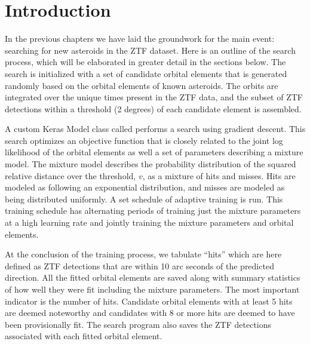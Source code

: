 \section{Introduction}
\label{section_search_intro}
In the previous chapters we have laid the groundwork for the main event: searching for new asteroids in the ZTF dataset.
Here is an outline of the search process, which will be elaborated in greater detail in the sections below.
The search is initialized with a set of candidate orbital elements that is generated randomly based on the orbital elements of known asteroids.
The orbits are integrated over the unique times present in the ZTF data, 
and the subset of ZTF detections within a threshold (2 degrees) of each candidate element is assembled.

A custom Keras Model class called  performs a search using gradient descent.
This search optimizes an objective function that is closely related to the joint log likelihood of the orbital elements
as well a set of parameters describing a mixture model.
The mixture model describes the probability distribution of the squared relative distance over the threshold, $v$, as a mixture of hits and misses.
Hits are modeled as following an exponential distribution, and misses are modeled as being distributed uniformly.
A set schedule of adaptive training is run.  
This training schedule has alternating periods of training just the mixture parameters at a high learning rate
and jointly training the mixture parameters and orbital elements.

At the conclusion of the training process, we tabulate ``hits'' which are here defined as ZTF detections that are within 10 arc seconds of the predicted direction.
All the fitted orbital elements are saved along with summary statistics of how well they were fit including the mixture parameters.
The most important indicator is the number of hits.
Candidate orbital elements with at least 5 hits are deemed noteworthy and candidates with 8 or more hits are deemed to have been provisionally fit.
The search program also saves the ZTF detections associated with each fitted orbital element.

